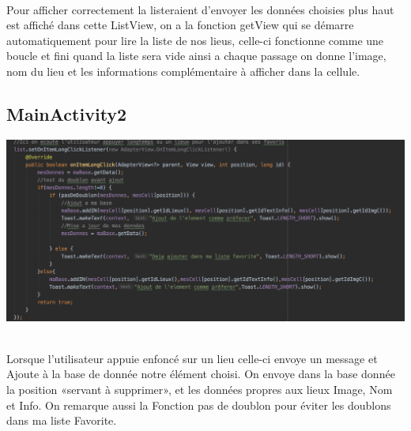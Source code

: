 \documentclass{article}
\begin{document}
\\
Pour afficher correctement la listeraient d’envoyer les données choisies plus haut est affiché dans cette ListView, on a la fonction getView qui se démarre automatiquement pour lire la liste de nos lieus, celle-ci fonctionne comme une boucle et fini quand la liste sera vide ainsi a chaque passage on donne l’image, nom du lieu et les informations complémentaire à afficher dans la cellule.
{\color{olive}\subsection{MainActivity2}}
\begin{minipage}{0.9\textwidth}
\includegraphics[width=\textwidth]{code3.png}
\end{minipage}
\\
Lorsque l’utilisateur appuie enfoncé sur un lieu celle-ci envoye un message et Ajoute à la base de donnée notre élément choisi. On envoye dans la base donnée la position «servant à supprimer», et les données propres aux lieux Image, Nom et Info.
On remarque aussi la Fonction pas de doublon pour éviter les doublons dans ma liste Favorite.
\end{document}
